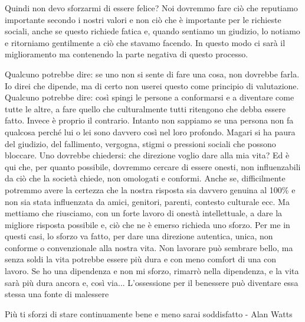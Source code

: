 \documentclass[12pt]{book} %
\begin{document}
Quindi non devo sforzarmi di essere felice? Noi dovremmo fare ciò che reputiamo importante secondo i nostri valori e non ciò che è importante per le richieste sociali, anche se questo richiede fatica e, quando sentiamo un giudizio, lo notiamo e ritorniamo gentilmente a ciò che stavamo facendo. In questo modo ci sarà il miglioramento ma contenendo la parte negativa di questo processo. 

Qualcuno potrebbe dire: se uno non si sente di fare una cosa, non dovrebbe farla.
Io direi che dipende, ma di certo non userei questo come principio di valutazione.
Qualcuno potrebbe dire: così spingi le persone a conformarsi e a diventare come tutte le altre, a fare quello che culturalmente tutti ritengono che debba essere fatto. Invece è proprio il contrario.
Intanto non sappiamo se una persona non fa qualcosa perché lui o lei sono davvero così nel loro profondo. Magari si ha paura del giudizio, del fallimento, vergogna, stigmi o pressioni sociali che possono bloccare.
Uno dovrebbe chiedersi: che direzione voglio dare alla mia vita? Ed è qui che, per quanto possibile, dovremmo cercare di essere onesti, non influenzabili da ciò che la società chiede, non omologati e conformi. Anche se, difficilmente potremmo avere la certezza che la nostra risposta sia davvero genuina al 100\% e non sia stata influenzata da amici, genitori, parenti, contesto culturale ecc. Ma mettiamo che riusciamo, con un forte lavoro di onestà intellettuale, a dare la migliore risposta possibile e, ciò che ne è emerso richieda uno sforzo. Per me in questi casi, lo sforzo va fatto, per dare una direzione autentica, unica, non conforme o convenzionale alla nostra vita. 
Non lavorare può sembrare bello, ma senza soldi la vita potrebbe essere più dura e con meno comfort di una con lavoro. Se ho una dipendenza e non mi sforzo, rimarrò nella dipendenza, e la vita sarà più dura ancora e, così via...
L’ossessione per il benessere può diventare essa stessa una fonte di malessere

Più ti sforzi di stare continuamente bene e meno sarai soddisfatto - Alan Watts
\end{document}
